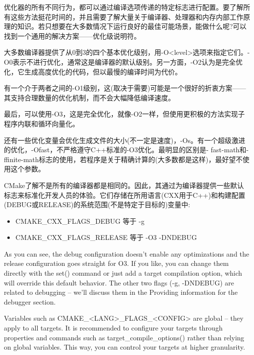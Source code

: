 
优化器的所有不同行为，都可以通过编译选项传递的特定标志进行配置。要了解所有这些方法挺花时间的，并且需要了解大量关于编译器、处理器和内存内部工作原理的知识。若只想要在大多数情况下运行良好的最佳可能场景，能做什么呢?可以找到一个通用的解决方案——优化级说明符。

大多数编译器提供了从0到3的四个基本优化级别，用-O<level>选项来指定它们。-O0表示不进行优化，通常这是编译器的默认级别。另一方面，-O2认为是完全优化，它生成高度优化的代码，但以最慢的编译时间为代价。

有一个介于两者之间的-O1级别，这(取决于需要)可能是一个很好的折衷方案——其支持合理数量的优化机制，而不会大幅降低编译速度。

最后，可以使用-O3，这是完全优化，就像-O2一样，但使用更积极的方法实现子程序内联和循环向量化。

还有一些优化变量会优化生成文件的大小(不一定是速度)，-Os。有一个超级激进的优化，-Ofast，不严格遵守C++标准的-O3优化。最明显的区别是- fast-math和-ffinite-math标志的使用，若程序是关于精确计算的(大多数都是这样)，最好望不使用这个参数。

CMake了解不是所有的编译器都是相同的。因此，其通过为编译器提供一些默认标志来标准化开发人员的体验。它们存储在所用语言(CXX用于C++)和构建配置(DEBUG或RELEASE)的系统范围(不是特定于目标的)变量中:

\begin{itemize}
\item 
CMAKE\_CXX\_FLAGS\_DEBUG 等于 -g

\item 
CMAKE\_CXX\_FLAGS\_RELEASE 等于 -O3 -DNDEBUG
\end{itemize}

As you can see, the debug configuration doesn't enable any optimizations and the release configuration goes straight for O3. If you like, you can change them directly with the set() command or just add a target compilation option, which will override this default behavior. The other two flags (-g, -DNDEBUG) are related to debugging – we'll discuss them in the Providing information for the debugger section.

Variables such as CMAKE\_<LANG>\_FLAGS\_<CONFIG> are global – they apply to all targets. It is recommended to configure your targets through properties and commands such as target\_compile\_options() rather than relying on global variables. This way, you can control your targets at higher granularity.

